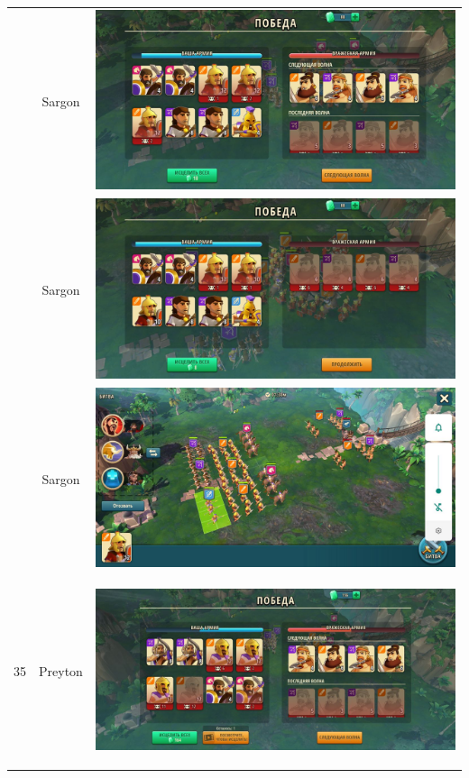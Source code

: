 \begin{longtable}{|c|c|c|}
	& Sargon &
	\includegraphics[width=0.75\linewidth]{./parts/media/TreasureHunt/35/sargon/photo_2022-04-07_10-08-41.jpg} \\
	& Sargon &
	\includegraphics[width=0.75\linewidth]{./parts/media/TreasureHunt/35/sargon/photo_2022-04-07_10-08-48.jpg} \\
	& Sargon &
	\includegraphics[width=0.75\linewidth]{./parts/media/TreasureHunt/35/sargon/photo_2022-04-07_10-08-33.jpg} \\
	\hline
	\multirow{12}{*}{35} & Preyton &
	\hypertarget{fight35}{\includegraphics[width=0.75\linewidth]{./parts/media/TreasureHunt/35/Preyton/35_1.jpg}} \\

\end{longtable}
